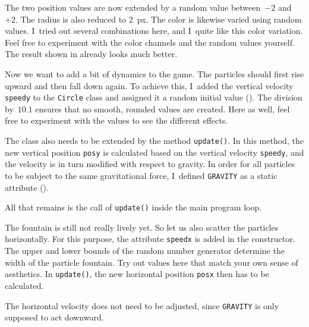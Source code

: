 The two position values are now extended by a random value between~$-2$ and~$+2$.
The radius is also reduced to \SI{2}{px}. The color is likewise varied using random values. I~tried out several combinations here, and I~quite like this color variation.
Feel free to experiment with the color channels and the random values yourself. The result shown in  already looks much better.



Now we want to add a bit of dynamics to the game. The particles should first rise upward and then fall down again. To achieve this, I~added the vertical velocity \texttt{speedy} to the \texttt{Circle} class and assigned it a random initial value
(). The division by~$10.1$ ensures that no smooth, rounded values are created. Here as well, feel free to experiment with the values to see the
different effects.

The class also needs to be extended by the method \texttt{update()}. In this method, the new vertical position \texttt{posy} is calculated based on the vertical velocity \texttt{speedy}, and the velocity is in turn modified with respect to \gls{gravity}. In order for all particles to be subject to the same gravitational force, I~defined \texttt{GRAVITY} as a static attribute ().


All that remains is the call of \texttt{update()} inside the main program loop.

\newpage
{}

The fountain is still not really lively yet. So let us also scatter the particles horizontally. For this purpose, the attribute \texttt{speedx} is added in the
constructor. The upper and lower bounds of the random number generator determine
the width of the particle fountain. Try out values here that match your own sense of aesthetics. In \texttt{update()}, the new horizontal position \texttt{posx} then
has to be calculated.

The horizontal velocity does not need to be adjusted, since \texttt{GRAVITY} is only supposed to act downward.

